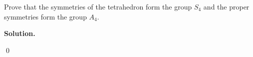 \documentclass[12pt]{book}
\theoremstyle{definition}
\newenvironment{solution}
{%
  \par\noindent\textbf{Solution.}\quad
}
{%
  \qed\par
}
\begin{document}
\begin{taggedexercise}[TODO]

\end{taggedexercise}

\begin{taggedexercise}[TODO]

\end{taggedexercise}

\begin{taggedexercise}[TODO]

\end{taggedexercise}

\begin{taggedexercise}[TODO]

\end{taggedexercise}

\begin{taggedexercise}[TODO]

\end{taggedexercise}

\begin{taggedexercise}[TODO]

\end{taggedexercise}

\begin{taggedexercise}[TODO]

\end{taggedexercise}

\begin{taggedexercise}[TODO]
  Prove that the symmetries of the tetrahedron form the group $S_4$ and the proper symmetries form the group $A_4$.
\end{taggedexercise}
\begin{solution}

\end{solution}
\end{document}
